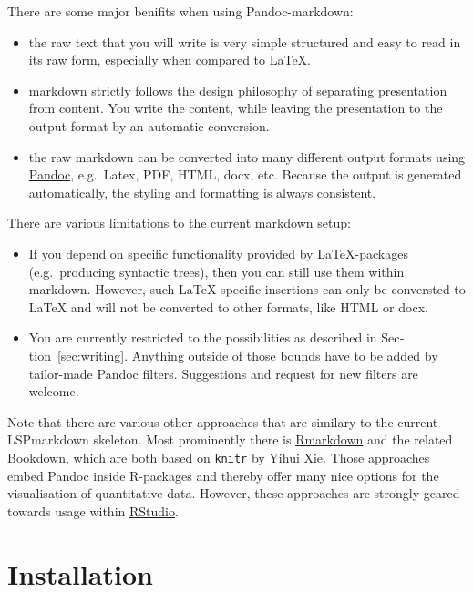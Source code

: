 There\paragraphnumber{[1.5]} are some major benifits when using
Pandoc-markdown:

\begin{itemize}
\tightlist
\item
  the raw text that you will write is very simple structured and easy to
  read in its raw form, especially when compared to LaTeX.
\item
  markdown strictly follows the design philosophy of separating
  presentation from content. You write the content, while leaving the
  presentation to the output format by an automatic conversion.
\item
  the raw markdown can be converted into many different output formats
  using \href{https;//pandoc.org}{Pandoc}, e.g.~Latex, PDF, HTML, docx,
  etc. Because the output is generated automatically, the styling and
  formatting is always consistent.
\end{itemize}

There\paragraphnumber{[1.6]} are various limitations to the current
markdown setup:

\begin{itemize}
\tightlist
\item
  If you depend on specific functionality provided by LaTeX-packages
  (e.g.~producing syntactic trees), then you can still use them within
  markdown. However, such LaTeX-specific insertions can only be
  conversted to LaTeX and will not be converted to other formats, like
  HTML or docx.
\item
  You are currently restricted to the possibilities as described in
  Sec­tion~\ref{sec:writing}. Anything outside of those bounds have to be
  added by tailor-made Pandoc filters. Suggestions and request for new
  filters are welcome.
\end{itemize}

Note\paragraphnumber{[1.7]} that there are various other approaches that
are similary to the current LSPmarkdown skeleton. Most prominently there
is \href{https://rmarkdown.rstudio.com}{Rmarkdown} and the related
\href{https://bookdown.org}{Bookdown}, which are both based on
\href{https://cran.r-project.org/web/packages/knitr/index.html}{\texttt{knitr}}
by Yihui Xie. Those approaches embed Pandoc inside R-packages and
thereby offer many nice options for the visualisation of quantitative
data. However, these approaches are strongly geared towards usage within
\href{https://posit.co/products/open-source/rstudio/}{RStudio}.

\hypertarget{sec:installation}{%
\section{Installation}\label{sec:installation}}

